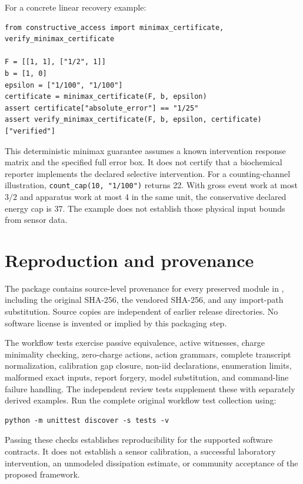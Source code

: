 For a concrete linear recovery example:
\begin{verbatim}
from constructive_access import minimax_certificate, verify_minimax_certificate

F = [[1, 1], ["1/2", 1]]
b = [1, 0]
epsilon = ["1/100", "1/100"]
certificate = minimax_certificate(F, b, epsilon)
assert certificate["absolute_error"] == "1/25"
assert verify_minimax_certificate(F, b, epsilon, certificate)["verified"]
\end{verbatim}
This deterministic minimax guarantee assumes a known intervention response
matrix and the specified full error box. It does not certify that a
biochemical reporter implements the declared selective intervention.
For a counting-channel illustration, \texttt{count\_cap(10, "1/100")}
returns 22. With gross event work at most $3/2$ and apparatus work at most
4 in the same unit, the conservative declared energy cap is 37. The example
does not establish those physical input bounds from sensor data.

\section{Reproduction and provenance}

The package contains source-level provenance for every preserved module in
, including the
original SHA-256, the vendored SHA-256, and any import-path substitution.
Source copies are independent of earlier release directories. No software
license is invented or implied by this packaging step.

The workflow tests exercise passive equivalence, active witnesses, charge
minimality checking, zero-charge actions, action grammars, complete
transcript normalization, calibration gap closure, non-iid declarations,
enumeration limits, malformed exact inputs, report forgery, model
substitution, and command-line failure handling. The independent review
tests supplement these with separately derived examples. Run the complete
original workflow test collection using:
\begin{verbatim}
python -m unittest discover -s tests -v
\end{verbatim}
Passing these checks establishes reproducibility for the supported software
contracts. It does not establish a sensor calibration, a successful
laboratory intervention, an unmodeled dissipation estimate, or community
acceptance of the proposed framework.

